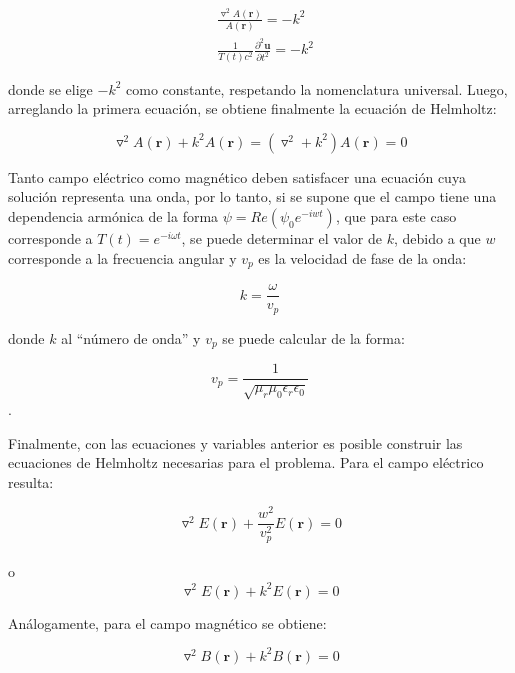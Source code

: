 \documentclass[12pt,letterpaper]{article}
\numberwithin{equation}{section}
\begin{document}
\begin{equation*}
\begin{split}
&\frac{\triangledown^2A(\textbf{r})}{A(\textbf{r})} = -k^2\\
&\frac{1}{T(t)c^2}\frac{\partial^2\textbf{u}}{\partial t^2} = -k^2
\end{split}    
\end{equation*} 

\noindent donde se elige $-k^2$ como constante, respetando la nomenclatura universal. Luego, arreglando la primera ecuación, se obtiene finalmente la ecuación de Helmholtz:

\begin{equation}
\triangledown^2A(\textbf{r})+k^2A(\textbf{r})=(\triangledown^2 + k^2)A(\textbf{r}) =0
\label{eq: ecuacion de helmholtz}
\end{equation}

Tanto campo eléctrico como magnético deben satisfacer una ecuación cuya solución representa una onda, por lo tanto, si se supone que el campo tiene una dependencia armónica de la forma $\psi = Re(\psi_{0}e^{-iwt})$, que para este caso corresponde a $T(t) = e^{-i\omega t}$, se puede determinar el valor de $k$, debido a que $w$ corresponde a la frecuencia angular y $v_{p}$ es la velocidad de fase de la onda:

$$k=\frac{\omega}{v_p}$$

\noindent donde $k$ al ``número de onda'' y $v_p$ se puede calcular de la forma:

$$v_p = \frac{1}{\sqrt{\mu_r\mu_0\epsilon_r\epsilon_0}}$$.

Finalmente, con las ecuaciones y variables anterior es posible construir las ecuaciones de Helmholtz necesarias para el problema. Para el campo eléctrico resulta:

\begin{equation*}
\triangledown^2E(\textbf{r})+\frac{w^2}{v_{p}^2}E(\textbf{r})=0
\end{equation*}
\\
o
\\
\begin{equation}
\triangledown^2E(\textbf{r})+k^2E(\textbf{r})=0
\label{eq:Helmholtz electrico}
\end{equation}

Análogamente, para el campo magnético se obtiene:

\begin{equation}
\triangledown^2B(\textbf{r})+k^2B(\textbf{r})=0
\label{eq:Helmholtz magnetico}
\end{equation}
\end{document}
